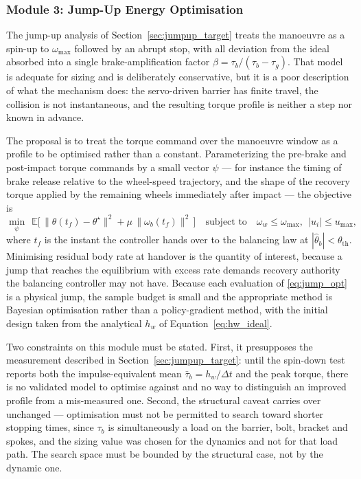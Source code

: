\subsubsection{Module 3: Jump-Up Energy Optimisation}

The jump-up analysis of Section~\ref{sec:jumpup_target} treats the manoeuvre as
a spin-up to $\omega_{\max}$ followed by an abrupt stop, with all deviation
from the ideal absorbed into a single brake-amplification factor
$\beta = \tau_b/(\tau_b-\tau_g)$. That model is adequate for sizing and is
deliberately conservative, but it is a poor description of what the mechanism
does: the servo-driven barrier has finite travel, the collision is not
instantaneous, and the resulting torque profile is neither a step nor known in
advance.

The proposal is to treat the torque command over the manoeuvre window as a
profile to be optimised rather than a constant. Parameterizing the
pre-brake and post-impact torque commands by a small vector $\psi$ --- for
instance the timing of brake release relative to the wheel-speed trajectory,
and the shape of the recovery torque applied by the remaining wheels
immediately after impact --- the objective is
\begin{equation}
\min_{\psi}\ \ \mathbb{E}\Big[\, \|\theta(t_f) - \theta^\star\|^2 + \mu\,\|\omega_b(t_f)\|^2 \,\Big]
\quad \text{subject to} \quad
\omega_w \le \omega_{\max},\ \ |u_i| \le u_{\max},
\label{eq:jump_opt}
\end{equation}
where $t_f$ is the instant the controller hands over to the balancing law at
$|\hat\theta_b| < \theta_{\text{th}}$. Minimising residual body rate at
handover is the quantity of interest, because a jump that reaches the
equilibrium with excess rate demands recovery authority the balancing
controller may not have. Because each evaluation of \eqref{eq:jump_opt} is a
physical jump, the sample budget is small and the appropriate method is
Bayesian optimisation rather than a policy-gradient method, with the initial
design taken from the analytical $h_w$ of Equation~\eqref{eq:hw_ideal}.

Two constraints on this module must be stated. First, it presupposes the
measurement described in Section~\ref{sec:jumpup_target}: until the spin-down
test reports both the impulse-equivalent mean
$\bar\tau_b = h_w/\Delta t$ and the peak torque, there is no validated model to
optimise against and no way to distinguish an improved profile from a
mis-measured one. Second, the structural caveat carries over unchanged ---
optimisation must not be permitted to search toward shorter stopping times,
since $\tau_b$ is simultaneously a load on the barrier, bolt, bracket and
spokes, and the sizing value was chosen for the dynamics and not for that load
path. The search space must be bounded by the structural case, not by the
dynamic one.

